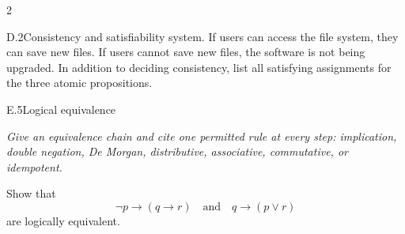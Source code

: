 \documentclass[9pt]{extarticle}
\begin{document}
\begin{multicols}{2}
\begin{CoreProblem}{D.2}{Consistency and satisfiability}
system. If users can access the file system, they can save new files. If users
cannot save new files, the software is not being upgraded. In addition to
deciding consistency, list all satisfying assignments for the three atomic
propositions.
\end{CoreProblem}
\begin{CoreProblem}{E.5}{Logical equivalence}
{\scriptsize\textit{Give an equivalence chain and cite one permitted rule at every step: implication, double negation, De Morgan, distributive, associative, commutative, or idempotent.}\par}
Show that
\[
  \neg p\to(q\to r)
  \quad\text{and}\quad
  q\to(p\lor r)
\]
are logically equivalent.
\end{CoreProblem}
\end{multicols}
\CoreWorkArea
\FormBreak
{}
\end{document}
